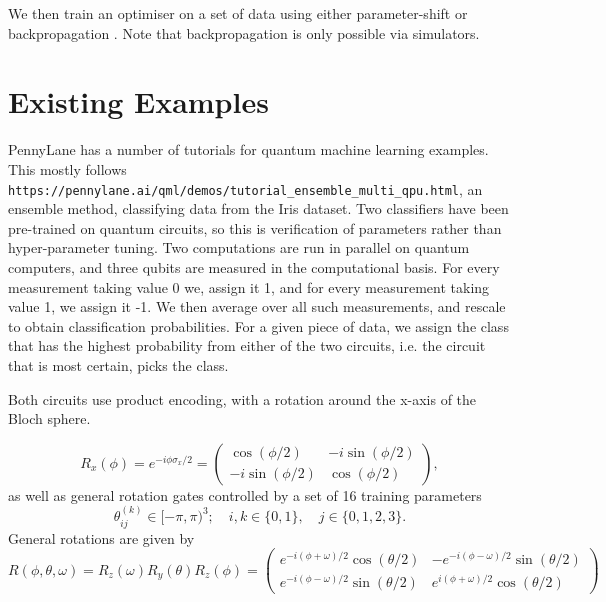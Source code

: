 \documentclass{article}
\theoremstyle{definition}
\begin{document}
We then train an optimiser on a set of data using either parameter-shift \cite{crooks2019gradients} or backpropagation \cite{watabe2019quantum}. Note that backpropagation is only possible via simulators.



\section{Existing Examples}
PennyLane has a number of tutorials for quantum machine learning examples. This mostly follows \\ \verb|https://pennylane.ai/qml/demos/tutorial_ensemble_multi_qpu.html|, an ensemble method, classifying data from the Iris dataset. Two classifiers have been pre-trained on quantum circuits, so this is verification of parameters rather than hyper-parameter tuning. Two computations are run in parallel on quantum computers, and three qubits are measured in the computational basis. For every measurement taking value 0 we, assign it 1, and for every measurement taking value 1, we assign it -1. We then average over all such measurements,  and rescale to obtain classification probabilities. For a given piece of data, we assign the class that has the highest probability from either of the two circuits, i.e. the circuit that is most certain, picks the class. 

Both circuits use product encoding, with a rotation around the x-axis of the Bloch sphere.

\[
R_x(\phi) = e^{ - i \phi \sigma_x / 2} = \begin{pmatrix} \cos ( \phi / 2) & - i \sin (\phi / 2) \\ - i \sin( \phi / 2) & \cos(\phi / 2)
\end{pmatrix},
\]
as well as general rotation gates controlled by a set of 16 training parameters 
\[
\theta_{ij}^{(k)} \in [- \pi, \pi)^3 ; \quad  i,k \in \{0,1\}, \quad j \in \{0,1,2,3\}.
\]
General rotations are given by
\[
R(\phi, \theta, \omega) = R_z(\omega)R_y(\theta)R_z(\phi) = \begin{pmatrix} e^{-i ( \phi + \omega) /2}\cos ( \theta / 2) & - e^{-i ( \phi - \omega) /2} \sin (\theta / 2) \\ e^{-i ( \phi - \omega) /2} \sin( \theta / 2) &  e^{i ( \phi + \omega) /2}\cos(\theta / 2)
\end{pmatrix}
\]
\end{document}
